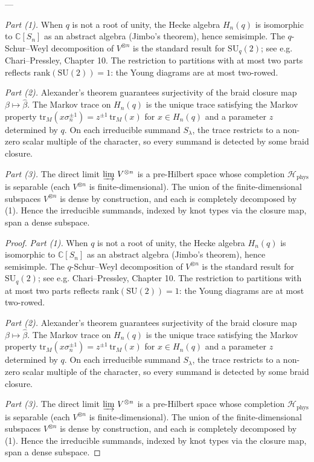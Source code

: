 \begin{proposition}
---

\emph{Part (1).}  When $q$ is not a root of unity, the Hecke algebra
$H_n(q)$ is isomorphic to $\mathbb{C}[S_n]$ as an abstract algebra
(Jimbo's theorem), hence semisimple.  The $q$-Schur--Weyl
decomposition of $V^{\otimes n}$ is the standard result for
$\mathrm{SU}_q(2)$; see e.g. Chari--Pressley, Chapter 10.  The
restriction to partitions with at most two parts reflects
$\mathrm{rank}(\mathrm{SU}(2)) = 1$: the Young diagrams are at most
two-rowed.

\emph{Part (2).}  Alexander's theorem guarantees surjectivity of the
braid closure map $\beta \mapsto \hat{\beta}$.  The Markov trace on
$H_n(q)$ is the unique trace satisfying the Markov property
$\mathrm{tr}_M(x \sigma_n^{\pm 1}) = z^{\pm 1}\,\mathrm{tr}_M(x)$ for
$x \in H_n(q)$ and a parameter $z$ determined by $q$.  On each
irreducible summand $S_\lambda$, the trace restricts to a non-zero
scalar multiple of the character, so every summand is detected by
some braid closure.

\emph{Part (3).}  The direct limit $\varinjlim\, V^{\otimes n}$ is a
pre-Hilbert space whose completion $\mathcal{H}_{\mathrm{phys}}$ is
separable (each $V^{\otimes n}$ is finite-dimensional).  The union of
the finite-dimensional subspaces $V^{\otimes n}$ is dense by
construction, and each is completely decomposed by (1).  Hence the
irreducible summands, indexed by knot types via the closure map,
span a dense subspace.
\end{proposition}
\begin{proof}
\emph{Part (1).}  When $q$ is not a root of unity, the Hecke algebra
$H_n(q)$ is isomorphic to $\mathbb{C}[S_n]$ as an abstract algebra
(Jimbo's theorem), hence semisimple.  The $q$-Schur--Weyl
decomposition of $V^{\otimes n}$ is the standard result for
$\mathrm{SU}_q(2)$; see e.g. Chari--Pressley, Chapter 10.  The
restriction to partitions with at most two parts reflects
$\mathrm{rank}(\mathrm{SU}(2)) = 1$: the Young diagrams are at most
two-rowed.

\emph{Part (2).}  Alexander's theorem guarantees surjectivity of the
braid closure map $\beta \mapsto \hat{\beta}$.  The Markov trace on
$H_n(q)$ is the unique trace satisfying the Markov property
$\mathrm{tr}_M(x \sigma_n^{\pm 1}) = z^{\pm 1}\,\mathrm{tr}_M(x)$ for
$x \in H_n(q)$ and a parameter $z$ determined by $q$.  On each
irreducible summand $S_\lambda$, the trace restricts to a non-zero
scalar multiple of the character, so every summand is detected by
some braid closure.

\emph{Part (3).}  The direct limit $\varinjlim\, V^{\otimes n}$ is a
pre-Hilbert space whose completion $\mathcal{H}_{\mathrm{phys}}$ is
separable (each $V^{\otimes n}$ is finite-dimensional).  The union of
the finite-dimensional subspaces $V^{\otimes n}$ is dense by
construction, and each is completely decomposed by (1).  Hence the
irreducible summands, indexed by knot types via the closure map,
span a dense subspace.
\end{proof}


